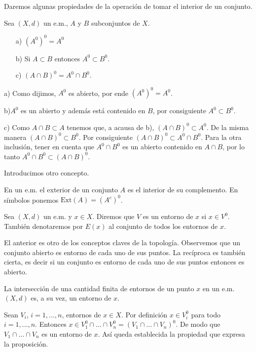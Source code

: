 Daremos algunas propiedades de la operación de tomar el interior
de un conjunto.
\begin{teorema}{} Sea $(X,d)$ un e.m., $A$ y $B$ subconjuntos de
$X$.
\begin{itemize}
\item[a)] $(A^0)^0=A^0$
\item[b)] Si $A\subset B$ entonces $A^0\subset B^0$.
\item[c)] $(A\cap B)^0=A^0\cap B^0$.
\end{itemize}
\end{teorema}
\begin{demo} a) Como dijimos, $A^0$ es abierto, por ende
$(A^0)^0=A^0$.

b)$A^0$ es un abierto y además está contenido en $B$, por
consiguiente $A^0\subset B^0$.

c) Como $A\cap B\subset A$ tenemos que, a acausa de b), $(A\cap
B)^0\subset A^0$. De la misma manera $(A\cap B)^0\subset B^0$. Por
consiguiente $(A\cap B)^0\subset A^0\cap B^0$. Para la otra
inclusión, tener en cuenta que $A^0\cap B^0$ es un abierto
contenido en $A\cap B$, por lo tanto $A^0\cap B^0\subset (A\cap
B)^0$.
\end{demo}
 Introducimos otro concepto.

\begin{definicion}{} En un e.m. el exterior de un conjunto $A$ es el
interior de su complemento. En símbolos ponemos
$\text{Ext}(A)=(A^c)^0$.
\end{definicion}


\begin{definicion}{} Sea $(X,d)$ un e.m. y $x\in X$. Diremos que $V$
es un entorno de $x$ si $x\in V^0$. También denotaremos por
$E(x)$ al conjunto de todos los entornos de $x$.
\end{definicion}

El anterior es otro de los conceptos claves de la topología.
Observemos que un conjunto abierto es entorno de cada uno de sus
puntos. La recíproca es también cierta, es decir si un
conjunto es entorno de cada uno de sus puntos entonces es abierto.

\begin{proposicion}{} La intersección de una cantidad finita de
entornos de un punto $x$ en un e.m. $(X,d)$ es, a su vez, un
entorno de $x$.
\end{proposicion}
\begin{demo} Sean $V_i$, $i=1,...,n$, entornos de $x\in X$. Por
definición $x\in V_i^0$ para todo $i=1,...,n$. Entonces $x\in
V_1^0\cap\dots\cap V_n^0=(V_1\cap\dots\cap V_n)^0$. De modo que
$V_1\cap\dots\cap V_n$ es un entorno de $x$. Así queda
establecida la propiedad que expresa la proposición.
\end{demo}

